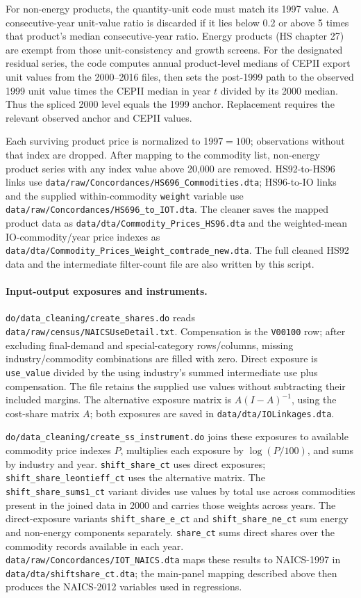 \documentclass[11pt]{article}
\newcommand{\pkgfile}[1]{\nolinkurl{#1}}
\begin{document}
For non-energy products, the quantity-unit code must match its 1997 value.
A consecutive-year unit-value ratio is discarded if it lies below 0.2 or
above 5 times that product's median consecutive-year ratio. Energy products
(HS chapter 27) are exempt from those unit-consistency and growth screens.
For the designated residual series, the code computes annual product-level
medians of CEPII export unit values from the 2000--2016 files, then sets the
post-1999 path to the observed 1999 unit value times the CEPII median in year
$t$ divided by its 2000 median. Thus the spliced 2000 level equals the 1999
anchor. Replacement requires the relevant observed anchor and CEPII values.

Each surviving product price is normalized to 1997$=100$; observations
without that index are dropped. After mapping to the commodity list,
non-energy product series with any index value above 20,000 are removed.
HS92-to-HS96 links use
\pkgfile{data/raw/Concordances/HS696_Commodities.dta}; HS96-to-IO links and
the supplied within-commodity \pkgfile{weight} variable use
\pkgfile{data/raw/Concordances/HS696_to_IOT.dta}. The cleaner saves the
mapped product data as \pkgfile{data/dta/Commodity_Prices_HS96.dta}
and the weighted-mean IO-commodity/year price indexes as
\pkgfile{data/dta/Commodity_Prices_Weight_comtrade_new.dta}.
The full cleaned HS92 data and the intermediate filter-count file are
also written by this script.

\paragraph{Input-output exposures and instruments.}
\pkgfile{do/data_cleaning/create_shares.do} reads
\pkgfile{data/raw/census/NAICSUseDetail.txt}. Compensation is the
\pkgfile{V00100} row; after excluding final-demand and special-category
rows/columns, missing industry/commodity combinations are filled with zero.
Direct exposure is \pkgfile{use_value} divided by the using industry's
summed intermediate use plus compensation. The file retains the supplied
use values without subtracting their included margins. The alternative
exposure matrix is $A(I-A)^{-1}$, using the cost-share matrix $A$; both
exposures are saved in \pkgfile{data/dta/IOLinkages.dta}.

\pkgfile{do/data_cleaning/create_ss_instrument.do} joins these exposures
to available commodity price indexes $P$, multiplies each exposure by
$\log(P/100)$, and sums by industry and year.
\pkgfile{shift_share_ct} uses direct exposures;
\pkgfile{shift_share_leontieff_ct} uses the alternative matrix. The
\pkgfile{shift_share_sums1_ct} variant divides use values by total use
across commodities present in the joined data in 2000 and carries those
weights across years. The direct-exposure variants
\pkgfile{shift_share_e_ct} and \pkgfile{shift_share_ne_ct} sum energy
and non-energy components separately. \pkgfile{share_ct} sums
direct shares over the commodity records available in each year.
\pkgfile{data/raw/Concordances/IOT_NAICS.dta} maps these results to
NAICS-1997 in \pkgfile{data/dta/shiftshare_ct.dta}; the main-panel mapping
described above then produces the NAICS-2012 variables used in regressions.
\end{document}
